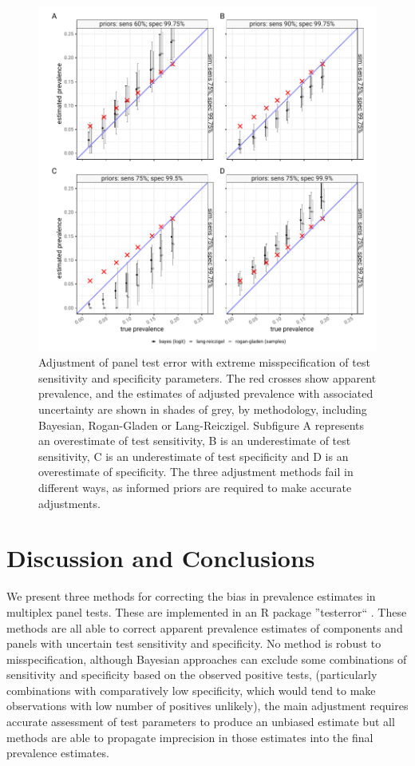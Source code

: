 \documentclass[a4paper, 12pt, twoside]{article}
\let\Oldsection\section
\renewcommand{\section}{\FloatBarrier\Oldsection}
\begin{document}
\begin{figure}[h!]
\centering
  \includegraphics{fig/bayesian_sim_mismatch_v2}
  \caption{Adjustment of panel test error with extreme misspecification of test sensitivity and specificity parameters.  The red crosses show apparent prevalence, and the estimates of adjusted prevalence with associated uncertainty are shown in shades of grey, by methodology, including Bayesian, Rogan-Gladen or Lang-Reiczigel. Subfigure A represents an overestimate of test sensitivity, B is an underestimate of test sensitivity, C is an underestimate of test specificity and D is an overestimate of specificity. The three adjustment methods fail in different ways, as informed priors are required to make accurate adjustments.}
\label{fig:B5}
\end{figure}

\section{Discussion and Conclusions}

We present three methods for correcting the bias in prevalence estimates in multiplex panel tests. These are implemented in an R package ''testerror`` \cite{challen2023d}. These methods are all able to correct apparent prevalence estimates of components and panels with uncertain test sensitivity and specificity. No method is robust to misspecification, although Bayesian approaches can exclude some combinations of sensitivity and specificity based on the observed positive tests, (particularly combinations with comparatively low specificity, which would tend to make observations with low number of positives unlikely), the main adjustment requires accurate assessment of test parameters to produce an unbiased estimate but all methods are able to propagate imprecision in those estimates into the final prevalence estimates.
\end{document}
